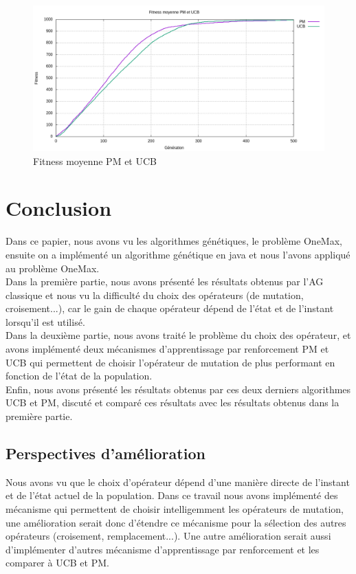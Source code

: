 \documentclass[12pt]{article}
\begin{document}
\begin{figure}[H]
	\begin{center}
		\includegraphics[scale=0.5]{img/curve_fitness_ucb_pm.png}
		\caption{Fitness moyenne PM et UCB}
		\label{curve_fitness_ucb_pm}
	\end{center}
\end{figure}

\section{Conclusion}
Dans ce papier, nous avons vu les algorithmes génétiques, le problème OneMax, ensuite on a implémenté un algorithme génétique en java et nous l'avons appliqué au problème OneMax.\\

Dans la première partie, nous avons présenté les résultats obtenus par l'AG classique et nous vu la difficulté du choix des opérateurs (de mutation, croisement...), car le gain de chaque opérateur dépend de l'état et de l'instant lorsqu'il est utilisé.\\

Dans la deuxième partie, nous avons traité le problème du choix des opérateur, et avons implémenté deux mécanismes d'apprentissage par renforcement PM et UCB qui permettent de choisir l'opérateur de mutation de plus performant en fonction de l'état de la population.\\

Enfin, nous avons présenté les résultats obtenus par ces deux derniers algorithmes UCB et PM, discuté et comparé ces résultats avec les résultats obtenus dans la première partie. 

\subsection{Perspectives d'amélioration}
Nous avons vu que le choix d'opérateur dépend d'une manière directe de l'instant et de l'état actuel de la population. Dans ce travail nous avons implémenté des mécanisme qui permettent de choisir intelligemment les opérateurs de mutation, une amélioration serait donc d'étendre ce mécanisme pour la sélection des autres opérateurs (croisement, remplacement...). Une autre amélioration serait aussi d'implémenter d'autres mécanisme d'apprentissage par renforcement et les comparer à UCB et PM.

\newpage
\renewcommand\headrulewidth{1 pt}\fancyhead[L]{}\fancyhead[C]{}


\end{document}
